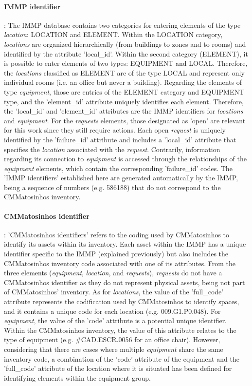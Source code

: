 \documentclass[a4paper, 10pt, twocolumn, twoside]{article}
\begin{document}
\paragraph{IMMP identifier}: The IMMP database contains two categories for entering elements of the type \emph{location}: LOCATION and ELEMENT. Within the LOCATION category, \emph{locations} are organized hierarchically (from buildings to zones and to rooms) and identified by the attribute 'local\_id'. Within the second category (ELEMENT), it is possible to enter elements of two types: EQUIPMENT and LOCAL. Therefore, the \emph{locations} classified as ELEMENT are of the type LOCAL and represent only individual rooms (i.e. an office but never a building). Regarding the elements of type \emph{equipment}, those are entries of the ELEMENT category and EQUIPMENT type, and the 'element\_id' attribute uniquely identifies each element. Therefore, the 'local\_id' and 'element\_id' attributes are the IMMP identifiers for \emph{locations} and \emph{equipment}. For the \emph{requests} elements, those designated as 'open' are relevant for this work since they still require actions. Each open \emph{request} is uniquely identified by the 'failure\_id' attribute and includes a 'local\_id' attribute that specifies the \emph{location} associated with the \emph{request}. Contrarily, information regarding its connection to \emph{equipment} is accessed through the relationships of the \emph{equipment} elements, which contain the corresponding 'failure\_id' codes. The 'IMMP identifiers' established here are generated automatically by the IMMP, being a sequence of numbers (e.g. 586188) that do not correspond to the CMMatosinhos inventory.

\paragraph{CMMatosinhos identifier}: 'CMMatosinhos identifiers' refers to the coding used by CMMatosinhos to identify its assets within its inventory. Each asset within the IMMP has a unique identifier specific to the IMMP (explained previously) but also includes the CMMatosinhos inventory code associated with one of its attributes. From the three elements (\emph{equipment}, \emph{location}, and \emph{requests}), \emph{requests} do not have a CMMatosinhos identifier as they do not represent physical assets, being not part of CMMatosinhos' inventory. As for \emph{locations}, the value of the 'full\_code' attribute represents the codification used by CMMatosinhos to identify spaces, and it contains a unique code for each location (e.g. 009.G1.P0.048). For \emph{equipment}, the value of the 'code' attribute is a potential unique identifier. Within the CMMatosinhos inventory, the value of this attribute relates to the type of equipment (e.g. \#CAD.ESCR.0056 for an office chair). However, considering that there are cases where multiple \emph{equipment} share the same inventory code, a combination of the 'code' attribute of the equipment and the 'full\_code' attribute of the location where it is situated has been defined for identifying elements within the equipment group.
\end{document}

